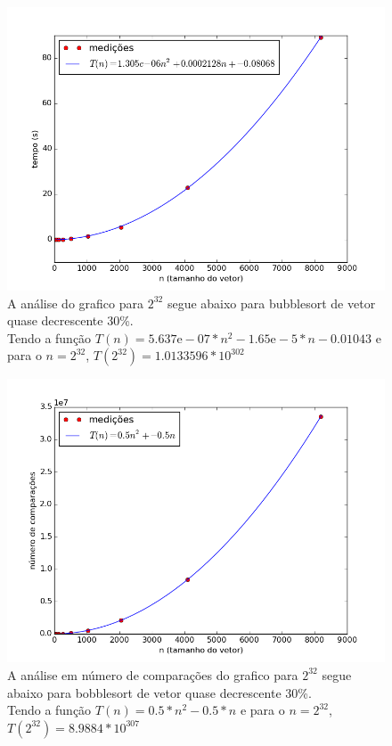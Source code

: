 \documentclass[12pt,a4paper,twoside]{report}
\begin{document}
\clearpage


\begin{figure}[ht]
\centering \includegraphics[scale=0.8]{../bolha/imagens/bolhaQuaseDecresc300.png}
\caption{A análise do grafico para $2^{32}$ segue abaixo para bubblesort de vetor quase decrescente 30\%.\\
Tendo a função $T(n) = 5.637\mathrm{e}-07*n^2-1.65\mathrm{e}-5*n-0.01043$ e para o $n =2^{32}$, $T(2^{32}) = 1.0133596 * 10^{302}$}
\label{fig:bolhaQuaseDecresc300}
\end{figure}

\begin{figure}[ht]
\centering \includegraphics[scale=0.8]{../bolha/imagens/bolhaQuaseDecresc301.png}
\caption{A análise em número de comparações do grafico para $2^{32}$ segue abaixo para bobblesort de vetor quase decrescente 30\%.\\
Tendo a função $T(n) = 0.5*n^2 - 0.5*n$ e para o $n =2^{32}$, $T(2^{32}) = 8.9884 * 10^{307}$}
\label{fig:bolhaQuaseDecresc301}
\end{figure}
\end{document}
